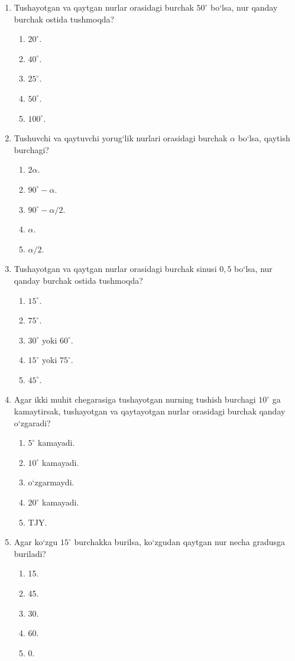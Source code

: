 \begin{enumerate}
\item Tushayotgan va qaytgan nurlar orasidagi burchak $50^\circ$ bo‘lsa, nur qanday burchak ostida tushmoqda?
\begin{enumerate}[label=\Alph*)]
\item $20^\circ$.
\item $40^\circ$.
\item $25^\circ$.
\item $50^\circ$.
\item $100^\circ$.
\end{enumerate}

\item Tushuvchi va qaytuvchi yorug‘lik nurlari orasidagi burchak $\alpha$ bo‘lsa, qaytish burchagi?
\begin{enumerate}[label=\Alph*)]
\item $2\alpha$.
\item $90^\circ-\alpha$.
\item $90^\circ-\alpha/2$.
\item $\alpha$.
\item $\alpha/2$.
\end{enumerate}

\item Tushayotgan va qaytgan nurlar orasidagi burchak sinusi $0,5$ bo‘lsa, nur qanday burchak ostida tushmoqda?
\begin{enumerate}[label=\Alph*)]
\item $15^\circ$.
\item $75^\circ$.
\item $30^\circ$ yoki $60^\circ$.
\item $15^\circ$ yoki $75^\circ$.
\item $45^\circ$.
\end{enumerate}

\item Agar ikki muhit chegarasiga tushayotgan nurning tushish burchagi $10^\circ$ ga kamaytirsak, tushayotgan va qaytayotgan nurlar orasidagi burchak qanday o‘zgaradi?
\begin{enumerate}[label=\Alph*)]
\item $5^\circ$ kamayadi.
\item $10^\circ$ kamayadi.
\item o‘zgarmaydi.
\item $20^\circ$ kamayadi.
\item TJY.
\end{enumerate}

\item Agar ko‘zgu $15^\circ$ burchakka burilsa, ko‘zgudan qaytgan nur necha gradusga buriladi?
\begin{enumerate}[label=\Alph*)]
\item 15.
\item 45.
\item 30.
\item 60.
\item 0.
\end{enumerate}


\end{enumerate}
